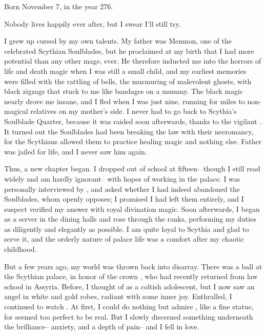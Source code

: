 \documentclass[char]{Kos}
\begin{document}
\name{\cButler{}}

Born November 7, in the year 276.

Nobody lives happily ever after, but I swear I'll still try.

I grew up cursed by my own talents. My father was Memnon, one of the celebrated Scythian Soulblades, but he proclaimed at my birth that I had more potential than any other mage, ever. He therefore inducted me into the horrors of life and death magic when I was still a small child, and my earliest memories were filled with the rattling of bells, the murmuring of malevolent ghosts, with black zigzags that stuck to me like bandages on a mummy. The black magic nearly drove me insane, and I fled when I was just nine, running for miles to non-magical relatives on my mother's side. I never had to go back to Scythia's Soulblade Quarter, because it was raided soon afterwards, thanks to the vigilant \cScythiaQueen{\Monarch} \cScythiaQueen{}. It turned out the Soulblades had been breaking the law with their necromancy, for the Scythians allowed them to practice healing magic and nothing else. Father was jailed for life, and I never saw him again.

Thus, a new chapter began. I dropped out of school at fifteen-- though I still read widely and am hardly ignorant-- with hopes of working in the palace. I was personally interviewed by\cScythiaQueen{\Monarch} \cScythiaQueen{}, and \cScythiaQueen{\they} asked whether I had indeed abandoned the Soulblades, whom \cScythiaQueen{\they} openly opposes; I promised I had left them entirely, and I suspect \cScythiaQueen{\they} verified my answer with royal divination magic. Soon afterwards, I began as a server in the dining halls and rose through the ranks, performing my duties as diligently and elegantly as possible. I am quite loyal to Scythia and glad to serve it, and the orderly nature of palace life was a comfort after my chaotic childhood.

But a few years ago, my world was thrown back into disarray. There was a ball at the Scythian palace, in honor of the crown \cBride{\prince} \cBride{}, who had recently returned from law school in Assyria. Before, I thought of \cBride{\them} as a coltish adolescent, but I now saw an angel in white and gold robes, radiant with some inner joy. Enthralled, I continued to watch \cBride{\them}. At first, I could do nothing but admire \cBride{\them}, like a fine statue, for \cBride{\they} seemed too perfect to be real. But I slowly discerned something underneath the brilliance-- anxiety, and a depth of pain-- and I fell in love. 
\end{document}
